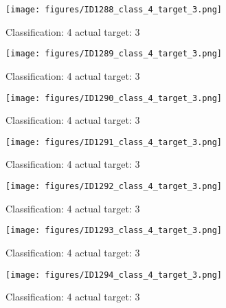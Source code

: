\begin{figure}[h!]
\begin{center}
\texttt{[image: figures/ID1288\_class\_4\_target\_3.png]}
\end{center}
\caption{ Classification: 4 actual target: 3}
\label{fig:ID1288_class_4_target_3}
\end{figure}
\begin{figure}[h!]
\begin{center}
\texttt{[image: figures/ID1289\_class\_4\_target\_3.png]}
\end{center}
\caption{ Classification: 4 actual target: 3}
\label{fig:ID1289_class_4_target_3}
\end{figure}
\begin{figure}[h!]
\begin{center}
\texttt{[image: figures/ID1290\_class\_4\_target\_3.png]}
\end{center}
\caption{ Classification: 4 actual target: 3}
\label{fig:ID1290_class_4_target_3}
\end{figure}
\begin{figure}[h!]
\begin{center}
\texttt{[image: figures/ID1291\_class\_4\_target\_3.png]}
\end{center}
\caption{ Classification: 4 actual target: 3}
\label{fig:ID1291_class_4_target_3}
\end{figure}
\begin{figure}[h!]
\begin{center}
\texttt{[image: figures/ID1292\_class\_4\_target\_3.png]}
\end{center}
\caption{ Classification: 4 actual target: 3}
\label{fig:ID1292_class_4_target_3}
\end{figure}
\begin{figure}[h!]
\begin{center}
\texttt{[image: figures/ID1293\_class\_4\_target\_3.png]}
\end{center}
\caption{ Classification: 4 actual target: 3}
\label{fig:ID1293_class_4_target_3}
\end{figure}
\begin{figure}[h!]
\begin{center}
\texttt{[image: figures/ID1294\_class\_4\_target\_3.png]}
\end{center}
\caption{ Classification: 4 actual target: 3}
\label{fig:ID1294_class_4_target_3}
\end{figure}
